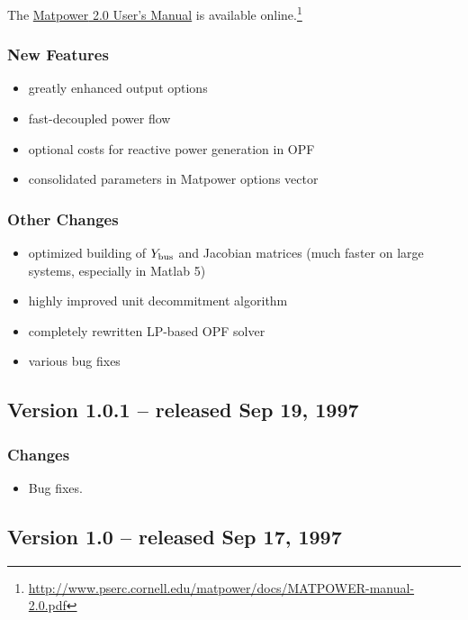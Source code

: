 \documentclass[12pt]{article}
\newcommand{\matlab}[0]{{\sc Matlab}}
\newcommand{\matpower}[0]{{\sc Matpower}}
\numberwithin{equation}{section}
\numberwithin{table}{section}
\numberwithin{figure}{section}
\begin{document}
\begin{appendices}
The \href{http://www.pserc.cornell.edu/matpower/docs/MATPOWER-manual-2.0.pdf}{\matpower{} 2.0 User's Manual} is available online.\footnote{\url{http://www.pserc.cornell.edu/matpower/docs/MATPOWER-manual-2.0.pdf}}

\subsubsection*{New Features}
\begin{itemize}
\item greatly enhanced output options
\item fast-decoupled power flow
\item optional costs for reactive power generation in OPF
\item consolidated parameters in \matpower{} options vector
\end{itemize}

\subsubsection*{Other Changes}
\begin{itemize}
\item optimized building of $Y_{\rm bus}$ and Jacobian matrices (much faster on large systems, especially in \matlab{} 5)
\item highly improved unit decommitment algorithm
\item completely rewritten LP-based OPF solver
\item various bug fixes
\end{itemize}

\subsection{Version 1.0.1 -- released Sep 19, 1997}
\label{app:v101}

\subsubsection*{Changes}
\begin{itemize}
\item Bug fixes.
\end{itemize}

\subsection{Version 1.0 -- released Sep 17, 1997}
\label{app:v10}


\end{appendices}
\end{document}
